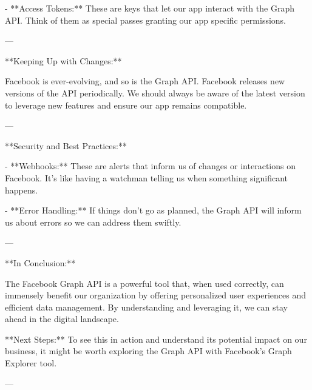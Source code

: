- **Access Tokens:** These are keys that let our app interact with the Graph API. Think of them as special passes granting our app specific permissions.

---

**Keeping Up with Changes:**

Facebook is ever-evolving, and so is the Graph API. Facebook releases new versions of the API periodically. We should always be aware of the latest version to leverage new features and ensure our app remains compatible.

---

**Security and Best Practices:**

- **Webhooks:** These are alerts that inform us of changes or interactions on Facebook. It's like having a watchman telling us when something significant happens.

- **Error Handling:** If things don't go as planned, the Graph API will inform us about errors so we can address them swiftly.

---

**In Conclusion:**

The Facebook Graph API is a powerful tool that, when used correctly, can immensely benefit our organization by offering personalized user experiences and efficient data management. By understanding and leveraging it, we can stay ahead in the digital landscape.

**Next Steps:** To see this in action and understand its potential impact on our business, it might be worth exploring the Graph API with Facebook's Graph Explorer tool.

---